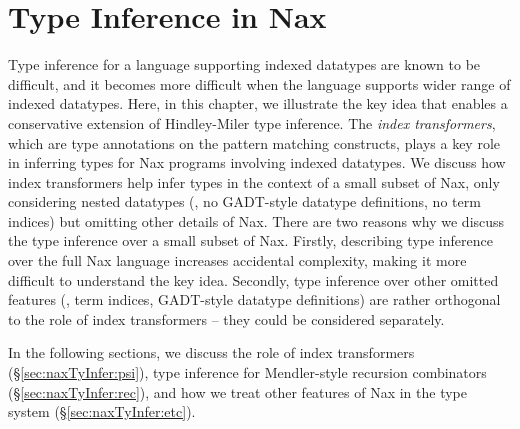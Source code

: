 \chapter{Type Inference in Nax} \label{ch:naxTyInfer}
Type inference for a language supporting indexed datatypes are
known to be difficult, and it becomes more difficult when the language
supports wider range of indexed datatypes. Here, in this chapter, we
illustrate the key idea that enables a conservative extension of
Hindley-Miler type inference.  The \emph{index transformers},
which are type annotations on the pattern matching constructs,
plays a key role in inferring types for Nax programs involving
indexed datatypes. We discuss how index transformers help infer types
in the context of a small subset of Nax, only considering nested datatypes
(\ie, no GADT-style datatype definitions, no term indices) but omitting other
details of Nax. There are two reasons why we discuss the type inference
over a small subset of Nax. Firstly, describing type inference over
the full Nax language increases accidental complexity, making it more
difficult to understand the key idea. Secondly, type inference over
other omitted features (\eg, term indices, GADT-style datatype definitions)
are rather orthogonal to the role of index transformers -- they could
be considered separately.

In the following sections, we discuss the role of index transformers
(\S\ref{sec:naxTyInfer:psi}), type inference for Mendler-style recursion
combinators (\S\ref{sec:naxTyInfer:rec}), and how we treat other features
of Nax in the type system (\S\ref{sec:naxTyInfer:etc}).

